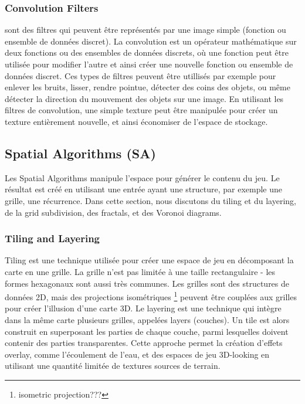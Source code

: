 \documentclass[11pt]{report}
\begin{document}
\subsubsection{Convolution Filters} sont des filtres qui peuvent être représentés par une image simple (fonction ou ensemble de données discret). La convolution est un opérateur mathématique sur deux fonctions ou des ensembles de données discrets,  où une fonction peut être utilisée pour modifier l'autre et ainsi créer une nouvelle fonction ou ensemble de données discret. Ces types de filtres peuvent être utillisés par exemple pour enlever les bruits, lisser, rendre pointue, détecter des coins des objets, ou même détecter la direction du mouvement des objets sur une image. En utilisant les filtres de convolution, une simple texture peut être manipulée pour créer un texture entièrement nouvelle, et ainsi économiser de l'espace de stockage.

\subsection{Spatial Algorithms (SA)}
Les Spatial Algorithms manipule l'espace pour générer le contenu du jeu. Le résultat est créé en utilisant une entrée ayant une structure, par exemple une grille, une récurrence. Dans cette section, nous discutons du tiling et du layering, de la grid subdivision, des fractals, et des Voronoi diagrams.

\subsubsection{Tiling and Layering} Tiling est une technique  utilisée pour créer une espace de jeu en décomposant la carte en une grille. La grille n'est pas limitée à une taille rectangulaire - les formes hexagonaux sont aussi très communes. Les grilles sont des structures de données 2D, mais des projections isométriques \footnote{isometric projection???} peuvent être couplées aux grilles pour créer l'illusion d'une carte 3D.
Le layering est une technique qui intègre dans la même carte plusieurs grilles, appelées layers (couches). Un tile est alors construit en superposant les parties de chaque couche, parmi lesquelles doivent contenir des parties transparentes. Cette approche permet la création d'effets overlay, comme l'écoulement de l'eau, et des espaces de jeu 3D-looking en utilisant une quantité limitée de textures sources de terrain.
\end{document}
